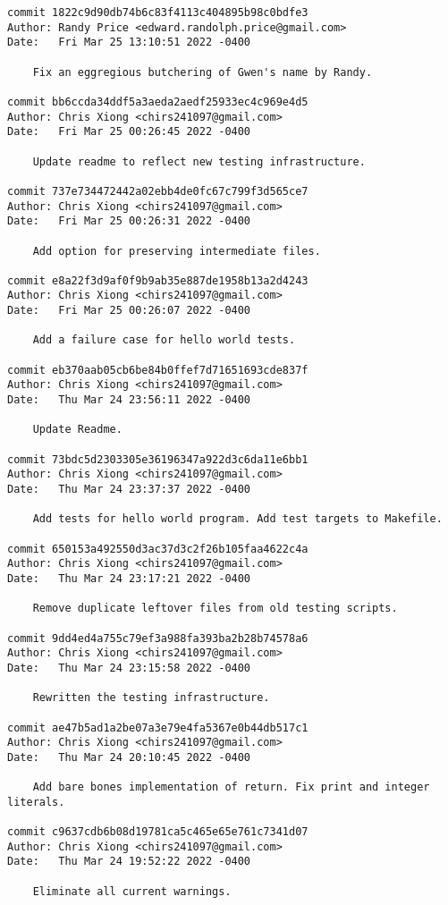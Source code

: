 {\begin{verbatim}
commit 1822c9d90db74b6c83f4113c404895b98c0bdfe3
Author: Randy Price <edward.randolph.price@gmail.com>
Date:   Fri Mar 25 13:10:51 2022 -0400

    Fix an eggregious butchering of Gwen's name by Randy.

commit bb6ccda34ddf5a3aeda2aedf25933ec4c969e4d5
Author: Chris Xiong <chirs241097@gmail.com>
Date:   Fri Mar 25 00:26:45 2022 -0400

    Update readme to reflect new testing infrastructure.

commit 737e734472442a02ebb4de0fc67c799f3d565ce7
Author: Chris Xiong <chirs241097@gmail.com>
Date:   Fri Mar 25 00:26:31 2022 -0400

    Add option for preserving intermediate files.

commit e8a22f3d9af0f9b9ab35e887de1958b13a2d4243
Author: Chris Xiong <chirs241097@gmail.com>
Date:   Fri Mar 25 00:26:07 2022 -0400

    Add a failure case for hello world tests.

commit eb370aab05cb6be84b0ffef7d71651693cde837f
Author: Chris Xiong <chirs241097@gmail.com>
Date:   Thu Mar 24 23:56:11 2022 -0400

    Update Readme.

commit 73bdc5d2303305e36196347a922d3c6da11e6bb1
Author: Chris Xiong <chirs241097@gmail.com>
Date:   Thu Mar 24 23:37:37 2022 -0400

    Add tests for hello world program. Add test targets to Makefile.

commit 650153a492550d3ac37d3c2f26b105faa4622c4a
Author: Chris Xiong <chirs241097@gmail.com>
Date:   Thu Mar 24 23:17:21 2022 -0400

    Remove duplicate leftover files from old testing scripts.

commit 9dd4ed4a755c79ef3a988fa393ba2b28b74578a6
Author: Chris Xiong <chirs241097@gmail.com>
Date:   Thu Mar 24 23:15:58 2022 -0400

    Rewritten the testing infrastructure.

commit ae47b5ad1a2be07a3e79e4fa5367e0b44db517c1
Author: Chris Xiong <chirs241097@gmail.com>
Date:   Thu Mar 24 20:10:45 2022 -0400

    Add bare bones implementation of return. Fix print and integer literals.

commit c9637cdb6b08d19781ca5c465e65e761c7341d07
Author: Chris Xiong <chirs241097@gmail.com>
Date:   Thu Mar 24 19:52:22 2022 -0400

    Eliminate all current warnings.


\end{verbatim}}
